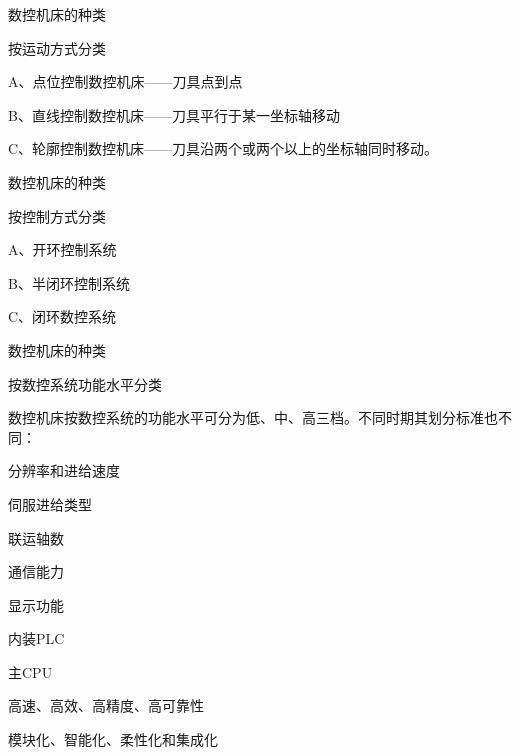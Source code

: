 \documentclass[UTF8,zihao=-4]{ctexbeamer}
\begin{document}
\begin{frame}{数控机床的种类}

按运动方式分类

A、点位控制数控机床——刀具点到点

B、直线控制数控机床——刀具平行于某一坐标轴移动

C、轮廓控制数控机床——刀具沿两个或两个以上的坐标轴同时移动。

\end{frame}

\begin{frame}{数控机床的种类}

按控制方式分类

A、开环控制系统

B、半闭环控制系统

C、闭环数控系统

\end{frame}

\begin{frame}{数控机床的种类}

按数控系统功能水平分类

数控机床按数控系统的功能水平可分为低、中、高三档。不同时期其划分标准也不同：

分辨率和进给速度

伺服进给类型

联运轴数

通信能力

显示功能

内装PLC

主CPU

高速、高效、高精度、高可靠性

模块化、智能化、柔性化和集成化

\end{frame}
\end{document}
